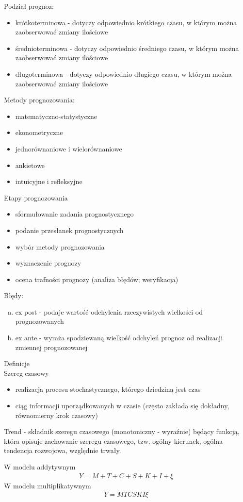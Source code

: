 Podział prognoz:
\begin{itemize}
\item krótkoterminowa - dotyczy odpowiednio krótkiego czasu, w którym można zaobserwować zmiany ilościowe
\item średnioterminowa - dotyczy odpowiednio średniego czasu, w którym można zaobserwować zmiany ilościowe
\item długoterminowa - dotyczy odpowiednio długiego czasu, w którym można zaobserwować zmiany ilościowe
\end{itemize}
Metody prognozowania:
\begin{itemize}
\item matematyczno-statystyczne
\item ekonometryczne
\item jednorównaniowe i wielorównaniowe
\item ankietowe
\item intuicyjne i refleksyjne
\end{itemize}
Etapy prognozowania
\begin{itemize}
\item sformułowanie zadania prognostycznego
\item podanie przesłanek prognostycznych
\item wybór metody prognozowania
\item wyznaczenie prognozy
\item ocena trafności prognozy (analiza błędów; weryfikacja)
\end{itemize}
Błędy:
\begin{enumerate}[a)]
\item ex post - podaje wartość odchylenia rzeczywistych wielkości od prognozowanych
\item ex ante - wyraża spodziewaną wielkość odchyleń prognoz od realizacji zmiennej prognozowanej
\end{enumerate}
Definicje\\
Szereg czasowy
\begin{itemize}
\item realizacja procesu stochastycznego, którego dziedziną jest czas
\item ciąg informacji uporządkowanych w czasie (często zakłada się dokładny, równomierny krok czasowy)
\end{itemize}
Trend - składnik szeregu czasowego (monotoniczny - wyraźnie) będący funkcją, która opisuje zachowanie szeregu czasowego, tzw. ogólny kierunek, ogólna tendencja rozwojowa, względnie trwały.
\begin{multicols}{2}
\centering W modelu addytywnym
\begin{gather*}
Y=M+T+C+S+K+I+\xi
\end{gather*}
\centering W modelu multiplikatywnym
\begin{gather*}
Y=MTCSKI\xi
\end{gather*}
\end{multicols}\noindent
